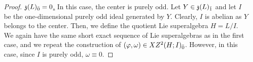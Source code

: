 \documentclass[12pt]{amsart}
\DeclareMathOperator{\K}{\mathbb{K}}
\newcommand{\blue}{\color{blue}}
\newcommand{\black}{\color{black}}
\begin{document}
\begin{proof}

\noindent\underline{$\mathfrak{z}(L)_{{\bar0}}=0$.} In this case, the center is purely odd. Let $Y\in\mathfrak{z}(L)_{{\bar1}}$ and let $I$ be the one-dimensional purely odd ideal generated by $Y$. Clearly, $I$ is abelian as $Y$ belongs to the center. Then, we define the quotient Lie superalgebra $H=L/I$. We again have the same short exact sequence of Lie superalgebras as in the first case, and we repeat the construction of $(\varphi,\omega)\in XZ^2(H;I)_{{\bar0}}$. However, in this case, since $I$ is purely odd, $\omega\equiv 0$.


\end{proof}
\end{document}
